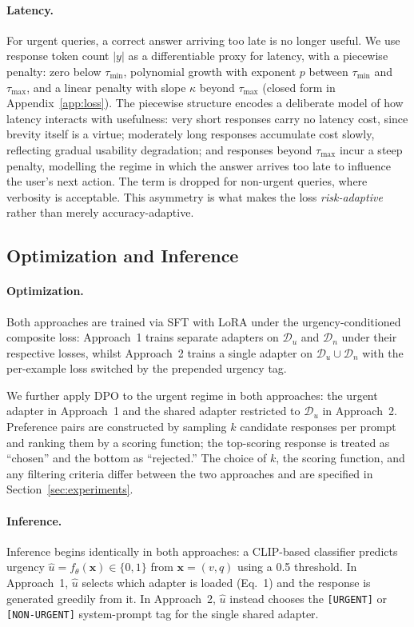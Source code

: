 \documentclass{article}
\begin{document}
\paragraph{Latency.} For urgent queries, a correct answer arriving too late is no longer useful. We use response token count $|y|$ as a differentiable proxy for latency, with a piecewise penalty: zero below $\tau_{\min}$, polynomial growth with exponent $p$ between $\tau_{\min}$ and $\tau_{\max}$, and a linear penalty with slope $\kappa$ beyond $\tau_{\max}$ (closed form in Appendix~\ref{app:loss}). The piecewise structure encodes a deliberate model of how latency interacts with usefulness: very short responses carry no latency cost, since brevity itself is a virtue; moderately long responses accumulate cost slowly, reflecting gradual usability degradation; and responses beyond $\tau_{\max}$ incur a steep penalty, modelling the regime in which the answer arrives too late to influence the user's next action. The term is dropped for non-urgent queries, where verbosity is acceptable. This asymmetry is what makes the loss \emph{risk-adaptive} rather than merely accuracy-adaptive.
\subsection{Optimization and Inference}\label{sec:optimization}

\paragraph{Optimization.}
Both approaches are trained via SFT with LoRA \cite{hu2022lora} under the urgency-conditioned composite loss: Approach~1 trains separate adapters on $\mathcal{D}_u$ and $\mathcal{D}_n$ under their respective losses, whilst Approach~2 trains a single adapter on $\mathcal{D}_u \cup \mathcal{D}_n$ with the per-example loss switched by the prepended urgency tag.

We further apply DPO \cite{rafailov2023dpo} to the urgent regime in both approaches: the urgent adapter in Approach~1 and the shared adapter restricted to $\mathcal{D}_u$ in Approach~2. Preference pairs are constructed by sampling $k$ candidate responses per prompt and ranking them by a scoring function; the top-scoring response is treated as ``chosen'' and the bottom as ``rejected.'' The choice of $k$, the scoring function, and any filtering criteria differ between the two approaches and are specified in Section~\ref{sec:experiments}.

\paragraph{Inference.}
Inference begins identically in both approaches: a CLIP-based classifier predicts urgency $\hat{u} = f_\theta(\mathbf{x}) \in \{0, 1\}$ from $\mathbf{x} = (v, q)$ using a 0.5 threshold. In Approach~1, $\hat{u}$ selects which adapter is loaded (Eq.~1) and the response is generated greedily from it. In Approach~2, $\hat{u}$ instead chooses the \texttt{[URGENT]} or \texttt{[NON-URGENT]} system-prompt tag for the single shared adapter.
\end{document}
